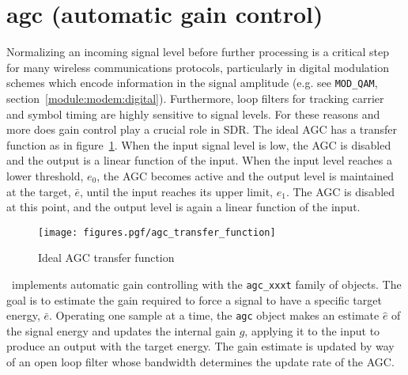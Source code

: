% 
%

\section{agc (automatic gain control)}
\label{module:agc}
Normalizing an incoming signal level before further processing is a critical
step for many wireless communications protocols, particularly in digital
modulation schemes which encode information in the signal amplitude (e.g. see
{\tt MOD\_QAM}, section~\ref{module:modem:digital}).
Furthermore, loop filters for tracking carrier and symbol timing are highly
sensitive to signal levels.
For these reasons and more does gain control play a crucial role in SDR.
The ideal AGC has a transfer function as in
figure~\ref{fig:module:agc:transfer_function}.
When the input signal level is low, the AGC is disabled and the output is a
linear function of the input.
When the input level reaches a lower threshold, $e_0$, the AGC becomes active
and the output level is maintained at the target, $\bar{e}$, until the input
reaches its upper limit, $e_1$.
The AGC is disabled at this point, and the output level is again a linear
function of the input.

\begin{figure}
\centering
  \texttt{[image: figures.pgf/agc\_transfer\_function]}
\caption{Ideal AGC transfer function}
\label{fig:module:agc:transfer_function}
\end{figure}

\liquid\ implements automatic gain controlling with the {\tt agc\_xxxt}
family of objects.
The goal is to estimate the gain required to force a signal to have a specific
target energy, $\bar{e}$.
Operating one sample at a time, the {\tt agc} object makes an estimate
$\hat{e}$ of the signal energy and updates the internal gain $g$,
applying it to the input to produce an output with the target energy.
The gain estimate is updated by way of an open loop filter whose bandwidth
determines the update rate of the AGC.

